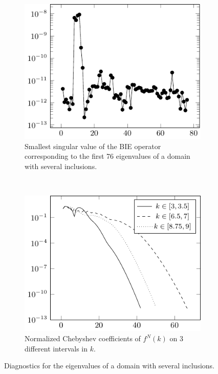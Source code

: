 \begin{figure}
  \centering
  \begin{subfigure}[t]{0.4\textwidth}
    \centering
    \includegraphics[width=\textwidth]{ex_many_holes_004_sings_plot}
    \caption{Smallest singular value of the BIE operator
      corresponding to the first 76 eigenvalues of a
      domain with several inclusions.}
    \label{subfig:many_inclusions_sings}
  \end{subfigure}
  ~
  \begin{subfigure}[t]{0.4\textwidth}
    \centering
    \includegraphics[width=\textwidth]{ex_many_holes_004_coeffs_plot}
    \caption{Normalized Chebyshev coefficients of $f^N(k)$ on
      3 different intervals in $k$.}
    \label{subfig:many_inclusions_coeffs}
  \end{subfigure}
  \caption{Diagnostics for the eigenvalues of a domain
    with several inclusions.}
  \label{fig:many_inclusions_diagnostics}
\end{figure}

